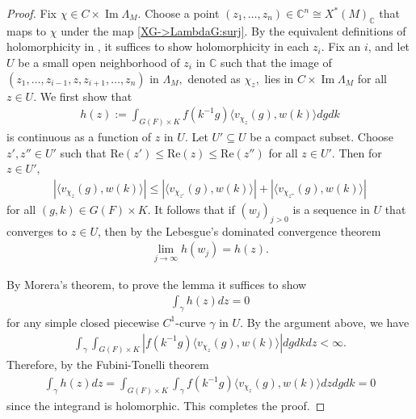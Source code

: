 \documentclass[10pt]{amsart}
\theoremstyle{definition}
\numberwithin{equation}{section}
\numberwithin{equation}{subsection}
\newcommand{\CC}{\mathbb{C}}
\renewcommand{\Im}{\mathop{\mathrm{Im}}}
\begin{document}
\begin{proof} 
Fix $\chi\in C\times \Im\Lambda_M.$ Choose a point $(z_1,\ldots,z_n)\in \CC^n\cong X^\ast(M)_\CC$ that maps to $\chi$ under the map \eqref{XG->LambdaG:surj}. By the equivalent definitions of holomorphicity in \cite[\S 0.2]{Complexanalysis}, it suffices to show holomorphicity in each $z_i$. Fix an $i$, and let $U$ be a small open neighborhood of $z_i$ in $\CC$ such that the image of $(z_1,\ldots,z_{i-1},z,z_{i+1},\ldots, z_n)$ in $\Lambda_M,$ denoted as $\chi_z,$ lies in $C\times\Im \Lambda_M$ for all $z\in U$. We first show that
\begin{align*}
    h(z):=\int_{G(F)\times K}f(k^{-1}g)\langle v_{\chi_z}(g),w(k)\rangle dgdk
\end{align*}
is continuous as a function of $z$ in $U$. Let $U'\subseteq U$ be a compact subset. Choose $z',z''\in U'$ such that $\mathrm{Re}(z')\le \mathrm{Re}(z)\le \mathrm{Re}(z'')$ for all $z\in U'.$ Then for $z\in U',$ 
\begin{align*}
     |\langle v_{\chi_z}(g),w(k)\rangle|\le |\langle v_{\chi_{z'}}(g),w(k)\rangle|+|\langle v_{\chi_{z''}}(g),w(k)\rangle| 
\end{align*}
for all $(g,k)\in G(F)\times K.$ It follows that if $(w_j)_{j>0}$ is a sequence in $U$ that converges to $z\in U$, then by the Lebesgue's dominated convergence theorem
\begin{align*}
    \lim_{j\to \infty} h(w_j)= h(z).
\end{align*}

 By Morera's theorem, to prove the lemma it suffices to show
\begin{align*}
    \int_{\gamma} h(z)dz=0
\end{align*}
for any simple closed piecewise $C^1$-curve $\gamma$ in $U$. By the argument above, we have
\begin{align*}
    \int_{\gamma}\int_{G(F)\times K} |f(k^{-1}g)\langle v_{\chi_z}(g),w(k)\rangle| dgdkdz<\infty.
\end{align*}
Therefore, by the Fubini-Tonelli theorem 
\begin{align*}
    \int_{\gamma}h(z)dz=\int_{G(F)\times K}\int_\gamma f(k^{-1}g)\langle v_{\chi_z}(g),w(k)\rangle dz dg dk=0
\end{align*}
since the integrand is holomorphic. This completes the proof.

\end{proof}
\end{document}
